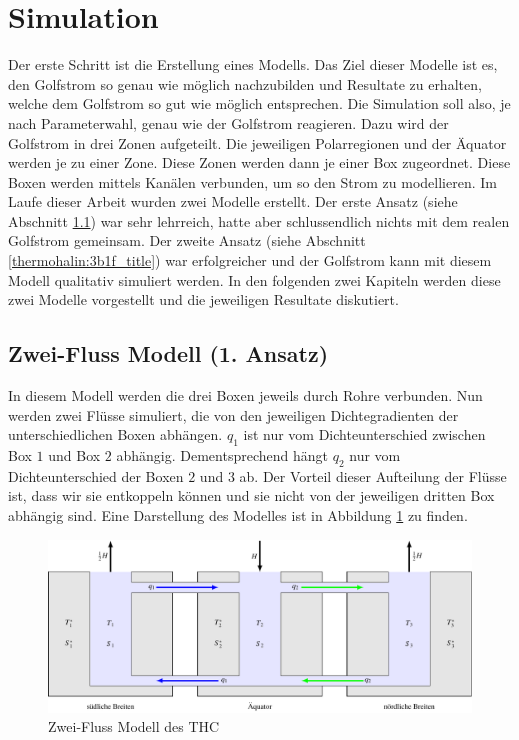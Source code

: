 \section{Simulation}

Der erste Schritt ist die Erstellung eines Modells.
Das Ziel dieser Modelle ist es, den Golfstrom so genau wie möglich nachzubilden und Resultate zu erhalten, welche dem Golfstrom so gut wie möglich entsprechen. Die Simulation soll also, je nach Parameterwahl, genau wie der Golfstrom reagieren.
Dazu wird der Golfstrom in drei Zonen aufgeteilt. Die jeweiligen Polarregionen und der Äquator werden je zu einer Zone. Diese Zonen werden dann je einer Box zugeordnet. Diese Boxen werden mittels Kanälen verbunden, um so den Strom zu modellieren. 
Im Laufe dieser Arbeit wurden zwei Modelle erstellt. Der erste Ansatz (siehe Abschnitt \ref{thermohalin:3b2f_title}) war sehr lehrreich, hatte aber schlussendlich nichts mit dem realen Golfstrom gemeinsam. Der zweite Ansatz (siehe Abschnitt \ref{thermohalin:3b1f_title}) war erfolgreicher und der Golfstrom kann mit diesem Modell qualitativ simuliert werden.
In den folgenden zwei Kapiteln werden diese zwei Modelle vorgestellt und die jeweiligen Resultate diskutiert.

\subsection{Zwei-Fluss Modell (1. Ansatz)}\label{thermohalin:3b2f_title}

In diesem Modell werden die drei Boxen jeweils durch Rohre verbunden. Nun werden zwei Flüsse simuliert, die von den jeweiligen Dichtegradienten der unterschiedlichen Boxen abhängen. $q_1$ ist nur vom Dichteunterschied zwischen Box $1$ und Box $2$ abhängig. Dementsprechend hängt $q_2$ nur vom Dichteunterschied der Boxen $2$ und $3$ ab.
Der Vorteil dieser Aufteilung der Flüsse ist, dass wir sie entkoppeln können und sie nicht von der jeweiligen dritten Box abhängig sind.
Eine Darstellung des Modelles ist in Abbildung \ref{thermohalin:3b2f} zu finden.

\begin{figure}
	\centering
	\includegraphics[width=14cm]{thermohalin/tikz/3b2f.pdf}
	\caption{Zwei-Fluss Modell des THC}
		\label{thermohalin:3b2f}
\end{figure}

